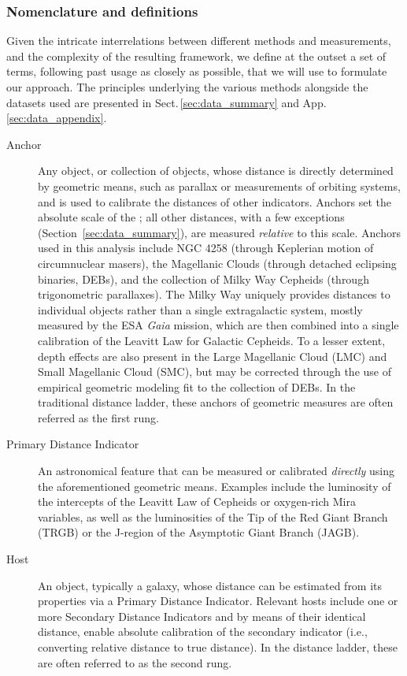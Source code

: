 \subsubsection{Nomenclature and definitions\label{sec:nomenclature}}

Given the intricate interrelations between different methods and measurements, and the complexity of the resulting framework, we define at the outset a set of terms, following past usage as closely as possible, that we will use to formulate our approach. The principles underlying the various methods alongside the datasets used are presented in Sect.\,\ref{sec:data_summary} and App.\,\ref{sec:data_appendix}.

\begin {description}
\item[Anchor] Any object, or collection of objects, whose distance is directly determined by geometric means, such as parallax or measurements of orbiting systems, and is used to calibrate the distances of other indicators. Anchors set the absolute scale of the \DN{}; all other distances, with a few exceptions (Section~\ref{sec:data_summary}), are measured {\it relative} to this scale.  Anchors used in this analysis include NGC 4258 (through Keplerian motion of circumnuclear masers), the Magellanic Clouds (through detached eclipsing binaries, DEBs), and the collection of Milky Way Cepheids (through trigonometric parallaxes).  The Milky Way uniquely provides distances to individual objects rather than a single extragalactic system, mostly measured by the ESA {\it Gaia} mission, which are then combined into a single calibration of the Leavitt Law for Galactic Cepheids.  To a lesser extent, depth effects are also present in the Large Magellanic Cloud (LMC) and Small Magellanic Cloud (SMC), but may be corrected through the use of empirical geometric modeling fit to the collection of DEBs. 
In the traditional distance ladder, these anchors of geometric measures are often referred as the first rung.

\item [Primary Distance Indicator]  An astronomical feature that can be measured or calibrated {\it directly} using the aforementioned geometric means.  Examples include the luminosity of the intercepts of the Leavitt Law of Cepheids or oxygen-rich Mira variables, as well as the luminosities of the Tip of the Red Giant Branch (TRGB) or the J-region of the Asymptotic Giant Branch (JAGB).

\item[Host] An object, typically a galaxy, whose distance can be estimated from its properties via a Primary Distance Indicator.  Relevant hosts include one or more Secondary Distance Indicators and by means of their identical distance, enable absolute calibration of the secondary indicator (i.e., converting relative distance to true distance).  In the distance ladder, these are often referred to as the {second rung}.


\end{description}
